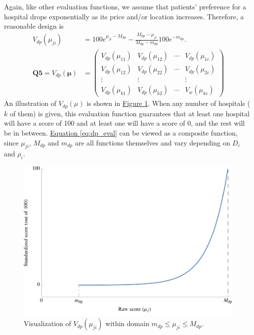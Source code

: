 \documentclass{article}
\begin{document}
Again, like other evaluation functions, we assume that patients' preference for a hospital drops exponentially as its price and/or location increases. Therefore, a reasonable design is
\begin{align}\label{eq:dp_eval}
    V_{dp}\left(\mu_{ji}\right) & = 100e^{\mu_{ji} - M_{dp}} - \frac{M_{dp} - \mu_{ji}}{M_{dp} - m_{dp}}100e^{-m_{dp}}.\\
     \mathbf{Q5} = V_{dp}\left(\boldsymbol{\mu}\right) & =
    \begin{pmatrix}
        V_{dp}\left(\mu_{11}\right) & V_{dp}\left(\mu_{12}\right) & \cdots & V_{dp}\left(\mu_{1c}\right)\\
        V_{dp}\left(\mu_{12}\right) & V_{dp}\left(\mu_{22}\right) & \cdots & V_{dp}\left(\mu_{2c}\right)\\
        \vdots & \vdots & & \vdots\\
        V_{dp}\left(\mu_{k1}\right) & V_{dp}\left(\mu_{k2}\right) & \cdots & V_w\left(\mu_{kc}\right)
    \end{pmatrix}
\end{align}
An illustration of $V_{dp}\left(\mu\right)$ is shown in \hyperref[fig:v_dp]{Figure \ref*{fig:v_dp}}. When any number of hospitals ($k$ of them) is given, this evaluation function guarantees that at least one hospital will have a score of 100 and at least one will have a score of 0, and the rest will be in between. \hyperref[eq:dp_eval]{Equation \ref*{eq:dp_eval}} can be viewed as a composite function, since $\mu_{ji}$, $M_{dp}$ and $m_{dp}$ are all functions themselves and vary depending on $D_i$ and $\rho_i$.

\begin{figure}[htbp]
    \centering
    \includegraphics[scale=.72]{v_dp.pdf}
    \caption{Visualization of $V_{dp}\left(\mu_{ji}\right)$ within domain $m_{dp} \le \mu_{ji} \le M_{dp}$.}
    \label{fig:v_dp}
\end{figure}
\newpage
\end{document}
